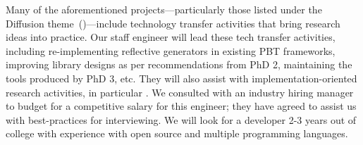


\smallskip{}
%
Many of the aforementioned projects---particularly those listed under
the Diffusion theme~()---include technology
transfer activities that bring research ideas into practice. Our staff
engineer will lead these tech transfer activities, including
re-implementing reflective generators in existing PBT frameworks,
improving library designs as per recommendations from PhD 2,
maintaining the tools produced by PhD 3, etc.  They will also assist
with implementation-oriented research activities, in particular
\tyche. We consulted with an industry hiring manager to budget for a
competitive salary for this engineer; they have agreed to assist us with
best-practices for interviewing. We will look for a developer 2-3 years
out of college with experience with open source and multiple
programming languages.


